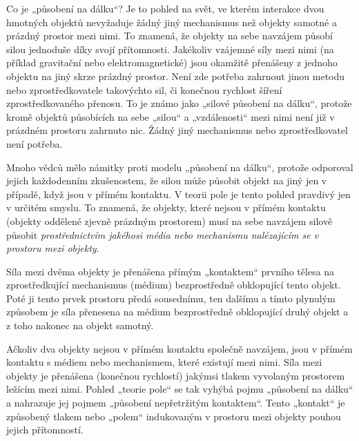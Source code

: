     Co je „působení na dálku“? Je to pohled na svět, ve kterém interakce dvou hmotných objektů nevyžaduje 
    žádný jiný mechanismus než objekty samotné a prázdný prostor mezi nimi. To znamená, že objekty na sebe 
    navzájem působí silou jednoduše díky svojí přítomnosti. Jakékoliv vzájemné síly mezi nimi (na příklad 
    gravitační nebo elektromagnetické) jsou okamžitě přenášeny z jednoho objektu na jiný skrze prázdný 
    prostor. Není zde potřeba zahrnout jinou metodu nebo zprostředkovatele takovýchto sil, či konečnou 
    rychlost šíření zprostředkovaného přenosu. To je známo jako „silové působení na dálku“, protože kromě 
    objektů působících na sebe „silou“ a „vzdálenosti“ mezi nimi není již v prázdném prostoru zahrnuto 
    nic. Žádný jiný mechanismus nebo zprostředkovatel není potřeba.
  
    Mnoho vědců mělo námitky proti modelu „působení na dálku“, protože odporoval jejich každodenním 
    zkušenostem, že silou může působit objekt na jiný jen v případě, když jsou v přímém kontaktu. V teorii 
    pole je tento pohled pravdivý jen v určitém smyslu. To znamená, že objekty, které nejsou v přímém 
    kontaktu (objekty oddělené zjevně prázdným prostorem) musí na sebe navzájem silově působit 
    \emph{prostřednictvím jakéhosi média nebo mechanismu nalézajícím se v prostoru mezi objekty}.
  
    Síla mezi dvěma objekty je přenášena přímým „kontaktem“ prvního tělesa na zpro\-středkující     
    mechanismus (médium) bezprostředně obklopující tento objekt. Poté ji tento prvek prostoru předá 
    sousednímu, ten dalšímu a tímto plynulým způsobem je síla přenesena na médium bezprostředně obklopující 
    druhý objekt a z toho nakonec na objekt samotný.
  
    Ačkoliv dva objekty nejsou v přímém kontaktu společně navzájem, jsou v přímém kontaktu s médiem nebo 
    mechanismem, které existují mezi nimi. Síla mezi objekty je přenášena (konečnou rychlostí) jakýmsi 
    tlakem vyvolaným prostorem ležícím mezi nimi. Pohled „teorie pole“ se tak vyhýbá pojmu „působení na 
    dálku“ a nahrazuje jej pojmem „působení nepřetržitým kontaktem“. Tento „kontakt“ je způsobený 
    tlakem nebo „polem“ indukovaným v prostoru mezi objekty pouhou jejich přítomností.

